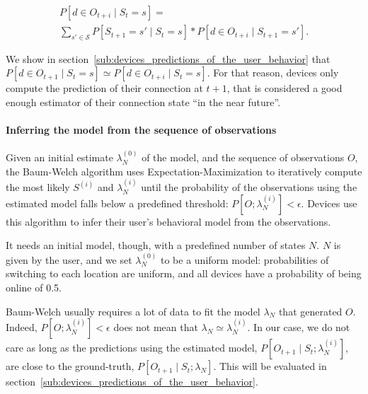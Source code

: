 \begin{multline*}
P\left[ d \in O_{t+i} \mid S_{t} = s \right] = \\
\sum\limits_{s' \in \mathcal{S}}
P\left[ S_{t+1} = s' \mid S_t = s \right] * 
P\left[ d \in O_{t+i} \mid S_{t+1} = s'\right].
\end{multline*}

We show in section~\ref{sub:devices_predictions_of_the_user_behavior} that $P\left[ d \in O_{t+1} \mid S_{t} = s \right] \simeq P\left[ d \in O_{t+i} \mid S_{t} = s \right]$. 
For that reason, devices only compute the prediction of their connection at $t+1$, that is considered a good enough estimator of their connection state ``in the near future''.


\paragraph*{Inferring the model from the sequence of observations}

Given an initial estimate $\lambda_{N}^{(0)}$ of the model, and the sequence of observations $O$, the Baum-Welch algorithm uses Expectation-Maximization to iteratively compute the most likely $S^{(i)}$ and $\lambda_{N}^{(i)}$ until the probability of the observations using the estimated model falls below a predefined threshold: $P[O; \lambda_{N}^{(i)}] < \epsilon$.
Devices use this algorithm to infer their user's behavioral model from the observations.

It needs an initial model, though, with a predefined number of states $N$. 
$N$ is given by the user, and we set $\lambda_{N}^{(0)}$ to be a uniform model: probabilities of switching to each location are uniform, and all devices have a probability of being online of 0.5.

Baum-Welch usually requires a lot of data to fit the model $\lambda_N$ that generated $O$.
Indeed, $P[O; \lambda_{N}^{(i)}] < \epsilon$ does not mean that $\lambda_N \simeq \lambda_N^{(i)}$.
In our case, we do not care as long as the predictions using the estimated model, $P[O_{t+1} \mid S_t; \lambda_N^{(i)}]$, are close to the ground-truth, $P[O_{t+1} \mid S_t; \lambda_N]$.
This will be evaluated in section~\ref{sub:devices_predictions_of_the_user_behavior}.